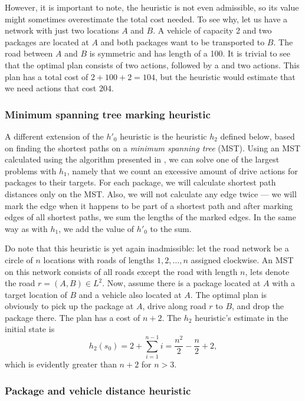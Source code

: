 However, it is important to note, the heuristic
is not even admissible, so its value might sometimes overestimate the total cost needed.
To see why, let us have a network with just two locations $A$ and $B$.
A vehicle of capacity 2 and two packages are located at $A$ and both packages want to be
transported to $B$. The road between $A$ and $B$ is symmetric and has length
of a 100. It is trivial to see that the optimal plan consists of two \pickup{} actions,
followed by a \drive{} and two \drop{} actions. This plan has a total cost of $2+100+2=104$,
but the heuristic would estimate that we need actions
that cost $204$.

\subsubsection{Minimum spanning tree marking heuristic}\label{sfa2}

A different extension of the $h'_0$ heuristic
is the heuristic $h_2$ defined below, based
on finding the shortest paths on a \textit{minimum spanning tree} (MST).
Using an MST calculated using the algorithm presented in \citet{Kruskal1956}, we can solve one of the largest problems with $h_1$,
namely that we count an excessive amount of drive actions
for packages to their targets.
For each package, we will calculate
shortest path distances only on the MST.
Also, we will not calculate any edge twice --- we will mark
the edge when it happens to be part of a shortest path and
after marking edges of all shortest paths,
we sum the lengths of the marked edges.
In the same way as with $h_1$, we add the value of $h'_0$ to
the sum.

Do note that this heuristic is yet again inadmissible:
let the road network be a circle of $n$ locations with
roads of lengths $1, 2, \ldots, n$ assigned clockwise.
An MST on this network consists of all roads except the road
with length $n$, lets denote the road $r = (A, B) \in L^2$.
Now, assume there is a package located at $A$ with a target
location of $B$ and a vehicle also located at $A$.
The optimal plan is obviously to pick up the package at $A$,
drive along road $r$ to $B$, and drop the package there.
The plan has a cost of $n+2$. The $h_2$ heuristic's estimate
in the initial state is $$h_2(s_0) = 2 + \sum_{i=1}^{n-1} i = \frac{n^2}{2} - \frac{n}{2} + 2,$$
which is evidently greater than $n+2$ for $n > 3$.

\subsubsection{Package and vehicle distance heuristic}\label{sfa3}

